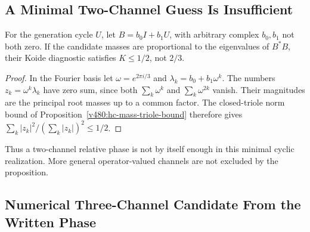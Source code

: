 \subsection{A Minimal Two-Channel Guess Is Insufficient}

\begin{proposition}
\label{v480:coupling-two-harmonic-bound}
For the generation cycle $U$, let $B=b_0I+b_1U$, with arbitrary
complex $b_0,b_1$ not both zero. If the candidate masses are
proportional to the eigenvalues of $B^*B$, their Koide diagnostic
satisfies $K\leq1/2$, not $2/3$.
\end{proposition}
\begin{proof}
In the Fourier basis let $\omega=e^{2\pi i/3}$ and
$\lambda_k=b_0+b_1\omega^k$. The numbers
$z_k=\omega^k\lambda_k$ have zero sum, since both
$\sum_k\omega^k$ and $\sum_k\omega^{2k}$ vanish.
Their magnitudes are the principal root masses up to a common
factor. The closed-triole norm bound of
Proposition~\ref{v480:hc-mass-triole-bound} therefore gives
$\sum_k|z_k|^2/(\sum_k|z_k|)^2\leq1/2$.
\end{proof}

Thus a two-channel relative phase is not by itself enough in this
minimal cyclic realization. More general operator-valued channels
are not excluded by the proposition.

\subsection{Numerical Three-Channel Candidate From the Written Phase}
\label{v480:coupling-evaluated-matrix}


